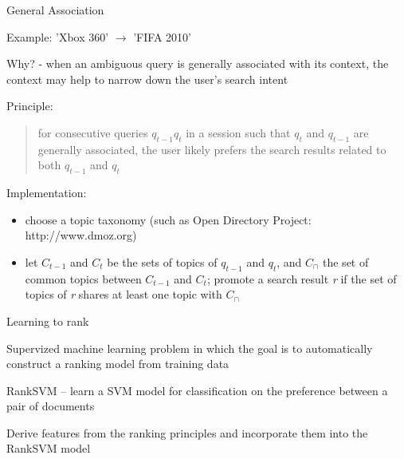 \begin{frame}{General Association}
\begin{small}

Example: \newline
'Xbox 360' $ \rightarrow $ 'FIFA 2010' \newline

Why? \newline
- when an ambiguous query is generally associated with its context, the context may help to narrow down the user's search intent \newline

Principle:
\begin{quotation}
for consecutive queries $ q_{t-1}q_{t} $ in a session such that $ q_{t} $ and $ q_{t-1} $ are generally associated, the user likely prefers the search results related to both $ q_{t-1} $ and $ q_{t} $
\end{quotation}

Implementation:
\begin{itemize}
	\item choose a topic taxonomy (such as Open Directory Project: http://www.dmoz.org)
	\item let $ C_{t-1} $ and $ C_{t} $ be the sets of topics of $ q_{t-1} $ and $ q_{t} $, and $ C_{\cap} $ the set of common topics between $ C_{t-1} $ and $ C_{t} $; promote a search result \emph{r} if the set of topics of \emph{r} shares at least one topic with $ C_{\cap} $
\end{itemize}

\end{small}
\end{frame}


\begin{frame}{Learning to rank}

Supervized machine learning problem in which the goal is to automatically construct a ranking model from training data \newline

RankSVM – learn a SVM model for classification on the preference between a pair of documents \newline

Derive features from the ranking principles and incorporate them into the RankSVM model

\end{frame}


